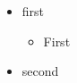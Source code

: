 \documentclass{article}
\begin{document}
\vspace*{\fill} \vspace*{-5ex}

\begin{itemize}
     \item first
     \begin{itemize}
         \item First
     \end{itemize}
     \item second
\end{itemize}

\vspace*{\fill}
\end{document}

